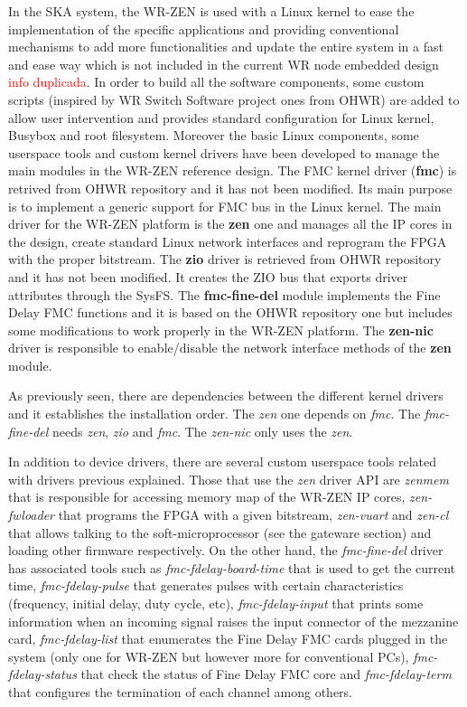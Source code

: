 In the SKA system, the WR-ZEN is used with a Linux 
kernel to ease the implementation of the specific applications and providing 
conventional mechanisms to add more functionalities and update the entire 
system in a fast and ease way which is not included in the current WR node 
embedded design \textcolor{red}{info duplicada}. In order to build all the software components, some custom 
scripts (inspired by WR Switch Software project ones from OHWR) are added to 
allow user intervention and provides standard configuration for Linux kernel, 
Busybox and root filesystem.  
Moreover the basic Linux components, some userspace tools and custom kernel 
drivers have been developed to manage the main modules in the WR-ZEN reference 
design. The FMC kernel driver (\textbf{fmc}) is retrived from OHWR repository and it has not
been modified. Its main purpose is to implement a generic support for FMC bus
in the Linux kernel. The main driver for the WR-ZEN platform is the \textbf{zen} one
and manages all the IP cores in the design, create standard Linux network interfaces and
reprogram the FPGA with the proper bitstream. The \textbf{zio} driver is 
retrieved from OHWR
repository and it has not been modified. It creates the ZIO bus that exports driver attributes
through the SysFS. The \textbf{fmc-fine-del} module implements the Fine Delay FMC functions and
it is based on the OHWR repository one but includes some modifications to work properly in the
WR-ZEN platform. The \textbf{zen-nic} driver is responsible to enable/disable the network 
interface methods of the \textbf{zen} module.

As previously seen, there are dependencies between the different kernel drivers and it establishes the installation order. The \textit{zen} one depends on \textit{fmc}. The \textit{fmc-fine-del} needs \textit{zen}, \textit{zio} and \textit{fmc}. The \textit{zen-nic} only uses the \textit{zen}.

In addition to device drivers, there are several custom userspace tools related with drivers previous explained. Those that use the \textit{zen} driver API are \textit{zenmem} that is responsible for accessing memory map of the WR-ZEN IP cores, \textit{zen-fwloader} that programs the FPGA with a given bitstream, \textit{zen-vuart} and \textit{zen-cl} that allows talking to the soft-microprocessor (see the gateware section) and loading other firmware respectively. On the other hand, the  \textit{fmc-fine-del} driver has associated tools such as \textit{fmc-fdelay-board-time} that is used to get the current time, \textit{fmc-fdelay-pulse} that generates pulses with certain characteristics (frequency, initial delay, duty cycle, etc), \textit{fmc-fdelay-input} that prints some information when an incoming signal raises the input connector of the mezzanine card, \textit{fmc-fdelay-list} that enumerates the Fine Delay FMC cards plugged in the system (only one for WR-ZEN but however more for conventional PCs), \textit{fmc-fdelay-status} that check the status of Fine Delay FMC core and \textit{fmc-fdelay-term} that configures the termination of each channel among others.

